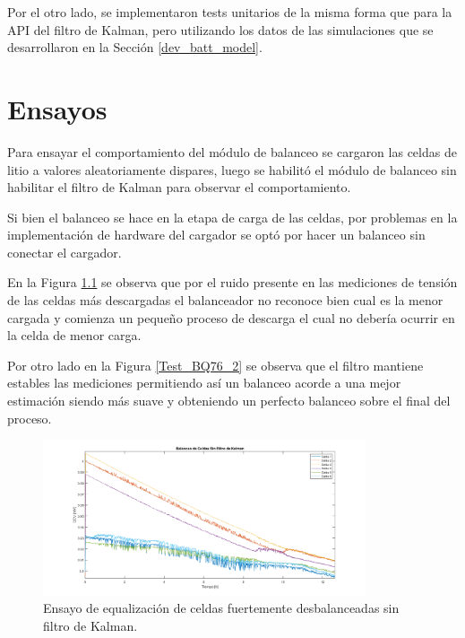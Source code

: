\documentclass[10pt, a4paper]{report}
\begin{document}
Por el otro lado, se implementaron tests unitarios de la misma forma que para la
\acrshort{API} del filtro de Kalman, pero utilizando los datos de las
simulaciones que se desarrollaron en la Secci\'on \ref{dev_batt_model}.

\clearpage

\chapter{Ensayos}\label{ensayos}
\thispagestyle{fancy}

Para ensayar el comportamiento del módulo de balanceo se cargaron las celdas de 
litio a valores aleatoriamente dispares, luego se habilitó el módulo de balanceo 
sin habilitar el filtro de Kalman para observar el comportamiento.

Si bien el balanceo se hace en la etapa de carga de las celdas, por problemas en 
la implementación de hardware del cargador se optó por hacer un balanceo sin 
conectar el cargador.

En la Figura \ref{Test_BQ76_1} se observa que por el ruido presente en las 
mediciones de tensión de las celdas más descargadas el balanceador no reconoce 
bien cual es la menor cargada y comienza un pequeño proceso de descarga el cual 
no debería ocurrir en la celda de menor carga.

Por otro lado en la Figura \ref{Test_BQ76_2} se observa que el filtro mantiene 
estables las mediciones permitiendo así un balanceo acorde a una mejor 
estimación siendo más suave y obteniendo un perfecto balanceo sobre el final del 
proceso.		

\begin{figure}[h!]
	\begin{center}
		\includegraphics[width=0.85\textwidth]{SF_Balancing_19_03_2019_F.png}
		\caption{Ensayo de equalización de celdas fuertemente desbalanceadas sin 
        filtro de Kalman.}
		\label{Test_BQ76_1}
	\end{center}
\end{figure}
\FloatBarrier
\end{document}
